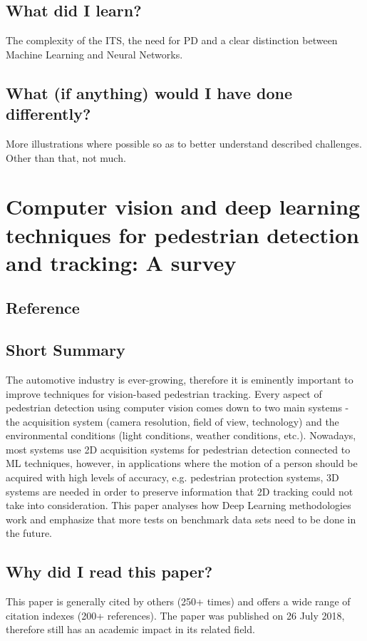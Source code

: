 \documentclass[11pt,a4paper]{article}
\begin{document}
\subsection*{What did I learn?}
The complexity of the ITS, the need for PD and a clear distinction between Machine Learning and Neural Networks.

\subsection*{What (if anything) would I have done differently?}
More illustrations where possible so as to better understand described challenges. Other than that, not much.
\newpage 

\section*{Computer vision and deep learning techniques for pedestrian detection
and tracking: A survey}
\subsection*{Reference}

\subsection*{Short Summary} 
The automotive industry is ever-growing, therefore it is eminently important to improve techniques for vision-based pedestrian tracking. Every aspect of pedestrian detection using computer vision comes down to two main systems - the acquisition system (camera resolution, field of view, technology) and the environmental conditions (light conditions, weather conditions, etc.). Nowadays, most systems use 2D acquisition systems for pedestrian detection connected to ML techniques, however, in applications where the motion of a person should be acquired with high levels of accuracy, e.g. pedestrian protection systems, 3D systems are needed in order to preserve information that 2D tracking could not take into consideration. This paper analyses how Deep Learning methodologies work and emphasize that more tests on benchmark data sets need to be done in the future.

\subsection*{Why did I read this paper?}
This paper is generally cited by others (250+ times) and offers a wide range of citation indexes (200+ references). The paper was published on 26 July 2018, therefore still has an academic impact in its related field.
\end{document}
